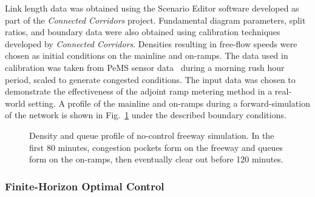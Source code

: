 Link length data was obtained using the Scenario Editor software developed
as part of the \textit{Connected Corridors} project. Fundamental diagram parameters, split ratios, and boundary data were
also obtained using calibration techniques developed by \emph{Connected
Corridors}. Densities resulting in free-flow speeds were chosen as
initial conditions on the mainline and on-ramps. The data used in calibration
was taken from PeMS sensor data~\cite{Chen2003} during a morning rush hour period,
scaled to generate congested conditions. The input data was chosen
to demonstrate the effectiveness of the adjoint ramp metering method
in a real-world setting. A profile of the mainline and on-ramps during
a forward-simulation of the network is shown in Fig.~\ref{fig:Density-and-queue}
under the described boundary conditions.
\begin{figure}
\hfill{}%
%								
\caption{Density and queue profile of no-control freeway simulation. In the
	first 80 minutes, congestion pockets form on the freeway and queues
	form on the on-ramps, then eventually clear out before 120 minutes.\label{fig:Density-and-queue}}
\end{figure}						
						
\subsubsection{Finite-Horizon Optimal Control\label{sub:Finite-horizon-optimal-control}}
						
